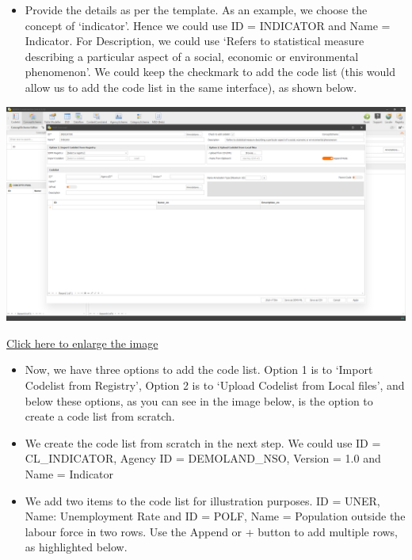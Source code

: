 \documentclass[
]{book}
\providecommand{\tightlist}{%
  \setlength{\itemsep}{0pt}\setlength{\parskip}{0pt}}
\begin{document}
\begin{itemize}
\tightlist
\item
  Provide the details as per the template. As an example, we choose the concept of `indicator'. Hence we could use ID = INDICATOR and Name = Indicator. For Description, we could use `Refers to statistical measure describing a particular aspect of a social, economic or environmental phenomenon'. We could keep the checkmark to add the code list (this would allow us to add the code list in the same interface), as shown below.
\end{itemize}

\begin{center}\includegraphics[width=1\linewidth]{./images/image241} \end{center}

\href{images/image241.png}{Click here to enlarge the image}

\begin{itemize}
\item
  Now, we have three options to add the code list. Option 1 is to `Import Codelist from Registry', Option 2 is to `Upload Codelist from Local files', and below these options, as you can see in the image below, is the option to create a code list from scratch.
\item
  We create the code list from scratch in the next step. We could use ID = CL\_INDICATOR, Agency ID = DEMOLAND\_NSO, Version = 1.0 and Name = Indicator
\item
  We add two items to the code list for illustration purposes. ID = UNER, Name: Unemployment Rate and ID = POLF, Name = Population outside the labour force in two rows. Use the Append or + button to add multiple rows, as highlighted below.
\end{itemize}
\end{document}
